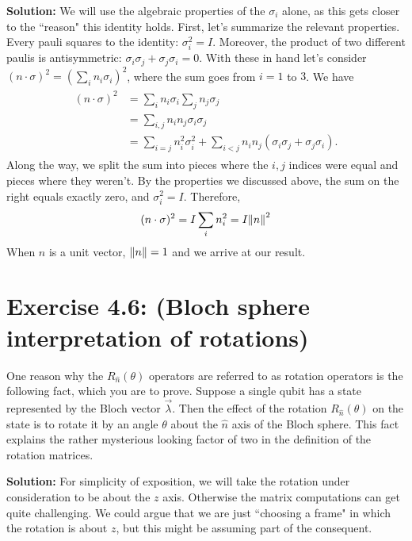 \documentclass{book}
\begin{document}
    \textbf{Solution:} We will use the algebraic properties of the $\sigma_i$ alone, as this gets closer to the ``reason" this identity holds. First, let's summarize the relevant properties. Every pauli squares to the identity: $\sigma_i^2 = I$. Moreover, the product of two different paulis is antisymmetric: $\sigma_i \sigma_j +\sigma_j \sigma_i = 0$. With these in hand let's consider $(n\cdot \sigma)^2 = (\sum_i n_i \sigma_i)^2$, where the sum goes from $i = 1$ to $3$. We have
    \begin{align}
    \begin{aligned}
        (n\cdot \sigma)^2 &= \sum_i n_i \sigma_i \sum_j n_j  \sigma_j \\
        &= \sum_{i,j} n_i n_j \sigma_i \sigma_j \\
        &= \sum_{i = j} n_i^2 \sigma_i^2 + \sum_{i<j} n_i n_j (\sigma_i \sigma_j + \sigma_j \sigma_i).
    \end{aligned}
    \end{align}
    Along the way, we split the sum into pieces where the $i,j$ indices were equal and pieces where they weren't. By the properties we discussed above, the sum on the right equals exactly zero, and $\sigma_i^2 = I$. Therefore,
    \begin{align}
        (n\cdot \sigma)^2 = I \sum_i n_i^2 = I \norm{n}^2
    \end{align}
    When $n$ is a unit vector, $\norm{n} = 1$ and we arrive at our result.
    
\section*{Exercise 4.6: (Bloch sphere interpretation of rotations)}
    One reason why the $R_{\hat{n}}(\theta)$ operators are referred to as rotation operators is the following fact, which you are to prove. Suppose a single qubit has a state represented by the Bloch vector $\vec{\lambda}$. Then the effect of the rotation $R_{\hat{n}}(\theta)$ on the state is to rotate it by an angle $\theta$ about the $\hat{n}$ axis of the Bloch sphere. This fact explains the rather mysterious looking factor of two in the definition of the rotation matrices.
    
    \textbf{Solution:} For simplicity of exposition, we will take the rotation under consideration to be about the $z$ axis. Otherwise the matrix computations can get quite challenging. We could argue that we are just ``choosing a frame" in which the rotation is about $z$, but this might be assuming part of the consequent. 
    
\end{document}
